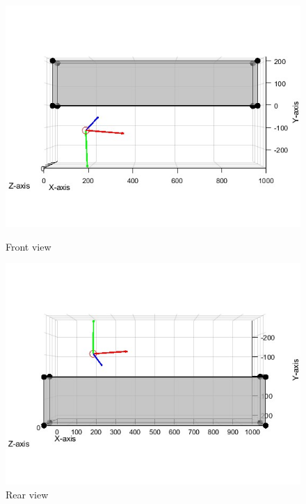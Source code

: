 \documentclass{Academic}
\begin{document}
\begin{figure}[!htb]
    \centering
    \begin{minipage}{0.4\linewidth}
        \centering
        \includegraphics[width=\linewidth]{images/xy.jpg}
        \caption{Front view}
    \end{minipage}%
    \begin{minipage}{0.4\linewidth}
        \centering
        \includegraphics[width=\linewidth]{images/yx.jpg}
        \caption{Rear view}
    \end{minipage}
    

\end{figure}
\end{document}
